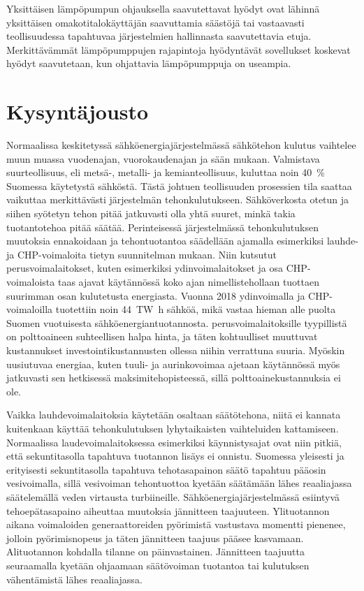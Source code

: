   Yksittäisen lämpöpumpun ohjauksella saavutettavat hyödyt ovat lähinnä yksittäisen omakotitalokäyttäjän saavuttamia säästöjä tai vastaavasti teollisuudessa tapahtuvaa järjestelmien hallinnasta saavutettavia etuja. Merkittävämmät lämpöpumppujen rajapintoja hyödyntävät sovellukset koskevat hyödyt saavutetaan, kun ohjattavia lämpöpumppuja on useampia.

\section{Kysyntäjousto}

  Normaalissa keskitetyssä sähköenergiajärjestelmässä sähkötehon kulutus vaihtelee muun muassa vuodenajan, vuorokaudenajan ja sään mukaan. Valmistava suurteollisuus, eli metsä-, metalli- ja kemianteollisuus, kuluttaa noin \SI{40}{\percent} Suomessa käytetystä sähköstä. Tästä johtuen teollisuuden prosessien tila saattaa vaikuttaa merkittävästi järjestelmän tehonkulutukseen\parencite{SVTehk}. Sähköverkosta otetun ja siihen syötetyn tehon pitää jatkuvasti olla yhtä suuret, minkä takia tuotantotehoa pitää säätää. Perinteisessä järjestelmässä tehonkulutuksen muutoksia ennakoidaan ja tehontuotantoa säädellään ajamalla esimerkiksi lauhde- ja \gls{CHP}-voimaloita tietyn suunnitelman mukaan.\parencite{energiateollisuus} Niin kutsutut perusvoimalaitokset, kuten esimerkiksi ydinvoimalaitokset ja osa \gls{CHP}-voimaloista taas ajavat käytännössä koko ajan nimellistehollaan tuottaen suurimman osan kulutetusta energiasta. Vuonna 2018 ydinvoimalla ja CHP-voimaloilla tuotettiin noin \SI{44}{\tera\watt\hour} sähköä, mikä vastaa hieman alle puolta Suomen vuotuisesta sähköenergiantuotannosta.\parencite{SVTSaLaTuo} perusvoimalaitoksille tyypillistä on polttoaineen suhteellisen halpa hinta, ja täten kohtuulliset muuttuvat kustannukset investointikustannusten ollessa niihin verrattuna suuria. Myöskin uusiutuvaa energiaa, kuten tuuli- ja aurinkovoimaa ajetaan käytännössä myös jatkuvasti sen hetkisessä maksimitehopisteessä, sillä polttoainekustannuksia ei ole.

  Vaikka lauhdevoimalaitoksia käytetään osaltaan säätötehona, niitä ei kannata kuitenkaan käyttää tehonkulutuksen lyhytaikaisten vaihteluiden kattamiseen. Normaalissa laudevoimalaitoksessa esimerkiksi käynnistysajat ovat niin pitkiä, että sekuntitasolla tapahtuva tuotannon lisäys ei onnistu.\parencite{VJV2018} Suomessa yleisesti ja erityisesti sekuntitasolla tapahtuva tehotasapainon säätö tapahtuu pääosin vesivoimalla\parencite{energiateollisuus}, sillä vesivoiman tehontuottoa kyetään säätämään lähes reaaliajassa säätelemällä veden virtausta turbiineille. Sähköenergiajärjestelmässä esiintyvä tehoepätasapaino aiheuttaa muutoksia jännitteen taajuuteen. Ylituotannon aikana voimaloiden generaattoreiden pyörimistä vastustava momentti pienenee, jolloin pyörimisnopeus ja täten jännitteen taajuus pääsee kasvamaan. Alituotannon kohdalla tilanne on päinvastainen. Jännitteen taajuutta seuraamalla kyetään ohjaamaan säätövoiman tuotantoa tai kulutuksen vähentämistä lähes reaaliajassa. \parencite{fingrid}

